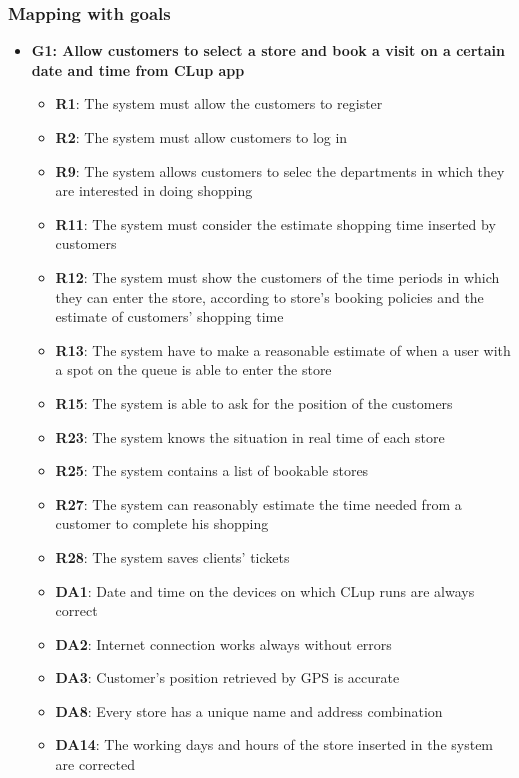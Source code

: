\documentclass{article}
\begin{document}
		\newpage
		
		\subsubsection{Mapping with goals}
			
			\begin{itemize}			

				\item {\bfseries G1: Allow customers to select a store and book a visit on a certain date and time
					from CLup app}			

					\begin{itemize}
						
						\item {\bfseries R1}: The system must allow the customers to register
						\item {\bfseries R2}: The system must allow customers to log in
						\item {\bfseries R9}: The system allows customers to selec the departments in which they are interested in doing shopping						\item {\bfseries R11}: The system must consider the estimate shopping time inserted by customers
						\item {\bfseries R12}: The system must show the customers of the time periods in which they can enter the store, according to store's booking policies and the estimate of customers' shopping time
						\item {\bfseries R13}: The system have to make a reasonable estimate of when a user with a spot on the queue is able to enter the store
						\item {\bfseries R15}: The system is able to ask for the position of the customers
						\item {\bfseries R23}: The system knows the situation in real time of each store 
						\item {\bfseries R25}: The system contains a list of bookable stores
						\item {\bfseries R27}: The system can reasonably estimate the time needed from a customer to complete his shopping
						\item {\bfseries R28}: The system saves clients' tickets						
						\item {\bfseries DA1}: Date and time on the devices on which CLup runs are always correct
						\item {\bfseries DA2}: Internet connection works always without errors
						\item {\bfseries DA3}: Customer’s position retrieved by GPS is accurate
						\item {\bfseries DA8}: Every store has a unique name and address combination
						\item {\bfseries DA14}: The working days and hours of the store inserted in the system are corrected
					

\end{itemize}
\end{itemize}
\end{document}
